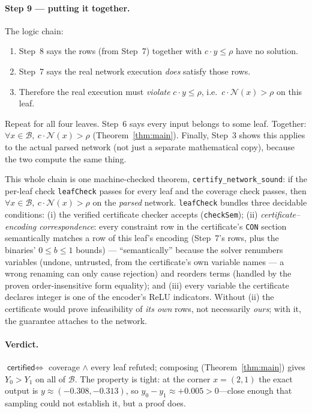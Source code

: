 \documentclass[runningheads]{llncs}
\newcommand{\net}{\mathcal{N}}
\newcommand{\dom}{\mathcal{B}}          %
\newcommand{\sound}{\textsf{certified}}
\newcommand{\code}[1]{\texttt{#1}}
\begin{document}
\paragraph{Step 9 --- putting it together.}
The logic chain:
\begin{enumerate}
\item Step~8 says the rows (from Step~7) together with $c\cdot y\le\rho$ have no solution.
\item Step~7 says the real network execution \emph{does} satisfy those rows.
\item Therefore the real execution must \emph{violate} $c\cdot y\le\rho$, i.e.\
      $c\cdot\net(x)>\rho$ on this leaf.
\end{enumerate}
Repeat for all four leaves. Step~6 says every input belongs to some leaf. Together:
$\forall x\in\dom,\ c\cdot\net(x)>\rho$ (Theorem~\ref{thm:main}). Finally, Step~3
shows this applies to the actual parsed network (not just a separate mathematical
copy), because the two compute the same thing.

This whole chain is one machine-checked theorem, \code{certify\_network\_sound}: if the
per-leaf check \code{leafCheck} passes for every leaf and the coverage check passes, then
$\forall x\in\dom,\ c\cdot\net(x)>\rho$ on the \emph{parsed} network. \code{leafCheck}
bundles three decidable conditions: (i) the verified certificate checker accepts
(\code{checkSem}); (ii) \emph{certificate--encoding correspondence}: every constraint row
in the certificate's \code{CON} section semantically matches a row of this leaf's
encoding (Step~7's rows, plus the binaries' $0\le b\le1$ bounds) --- ``semantically''
because the solver renumbers variables (undone, untrusted, from the certificate's own
variable names --- a wrong renaming can only cause rejection) and reorders terms (handled
by the proven order-insensitive form equality); and (iii) every variable the certificate
declares integer is one of the encoder's ReLU indicators. Without (ii) the certificate
would prove infeasibility of \emph{its own} rows, not necessarily \emph{ours}; with it,
the guarantee attaches to the network.

\paragraph{Verdict.} $\sound\iff$ coverage $\wedge$ every leaf refuted; composing
(Theorem~\ref{thm:main}) gives $Y_0>Y_1$ on all of $\dom$. The property is tight:
at the corner $x=(2,1)$ the exact output is $y\approx(-0.308,-0.313)$, so
$y_0-y_1\approx+0.005>0$---close enough that sampling could not establish it, but a
proof does.
\end{document}
